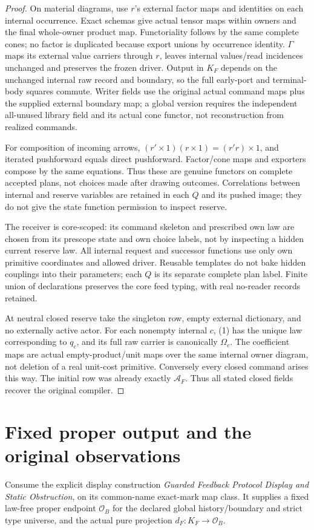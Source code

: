 \documentclass[11pt]{article}
\begin{document}
\begin{proof}
On material diagrams, use $r$'s external factor maps and identities on each internal occurrence. Exact schemas give actual tensor maps within owners and the final whole-owner product map. Functoriality follows by the same complete cones; no factor is duplicated because export unions by occurrence identity. $\Gamma$ maps its external value carriers through $r$, leaves internal values/read incidences unchanged and preserves the frozen driver. Output in $K_F$ depends on the unchanged internal raw record and boundary, so the full early-port and terminal-body squares commute. Writer fields use the original actual command maps plus the supplied external boundary map; a global version requires the independent all-unused library field and its actual cone functor, not reconstruction from realized commands.

For composition of incoming arrows, $(r'\times1)(r\times1)=(r'r)\times1$, and iterated pushforward equals direct pushforward. Factor/cone maps and exporters compose by the same equations. Thus these are genuine functors on complete accepted plans, not choices made after drawing outcomes. Correlations between internal and reserve variables are retained in each $Q$ and its pushed image; they do not give the state function permission to inspect reserve.

The receiver is core-scoped: its command skeleton and prescribed own law are chosen from its prescope state and own choice labels, not by inspecting a hidden current reserve law. All internal request and successor functions use only own primitive coordinates and allowed driver. Reusable templates do not bake hidden couplings into their parameters; each $Q$ is its separate complete plan label. Finite union of declarations preserves the core feed typing, with real no-reader records retained.

At neutral closed reserve take the singleton row, empty external dictionary, and no externally active actor. For each nonempty internal $c$, (1) has the unique law corresponding to $q_c$, and its full raw carrier is canonically $\Omega_c$. The coefficient maps are actual empty-product/unit maps over the same internal owner diagram, not deletion of a real unit-cost primitive. Conversely every closed command arises this way. The initial row was already exactly $\mathcal A_F$. Thus all stated closed fields recover the original compiler.\end{proof}


\section{Fixed proper output and the original observations}
Consume the explicit display construction \emph{Guarded Feedback Protocol Display and Static Obstruction}, on its common-name exact-mark map class. It supplies a fixed law-free proper endpoint $\mathcal O_B$ for the declared global history/boundary and strict type universe, and the actual pure projection $d_F:K_F\to\mathcal O_B$.
\end{document}
